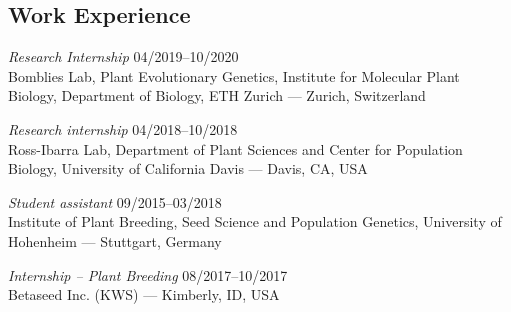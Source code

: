 \documentclass[margin,10pt,a4paper]{res}
\begin{document}
\begin{resume}
\section{Work Experience}

{\sl Research Internship} \hfill 04/2019--10/2020 \\
Bomblies Lab, Plant Evolutionary Genetics, Institute for Molecular Plant Biology, Department of Biology, ETH Zurich --- Zurich, Switzerland


{\sl Research internship} \hfill 04/2018--10/2018 \\
Ross-Ibarra Lab, Department of Plant Sciences and Center for Population Biology, University of California Davis --- Davis, CA, USA



{\sl Student assistant} \hfill 09/2015--03/2018 \\
Institute of Plant Breeding, Seed Science and Population Genetics, University of Hohenheim --- Stuttgart, Germany



{\sl Internship -- Plant Breeding} \hfill 08/2017--10/2017 \\
Betaseed Inc. (KWS) --- Kimberly, ID, USA



\end{resume}
\end{document}
